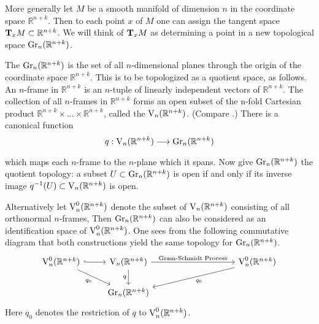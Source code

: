 \documentclass[../main]{subfiles}
\begin{document}
More generally let $M$ be a smooth manifold of dimension $n$ in the coordinate space $\mathbb{R}^{n+k}$. Then to each point $x$ of $M$ one can assign the tangent space \newline $\tangentspace{M}{x} \subset \mathbb{R}^{n+k}$. We will think of $\tangentspace{M}{x}$ as determining a point in a new topological space $\grassmannian_n (\mathbb{R}^{n+k})$.
\begin{definition}\label{def:5-1}
The  $\grassmannian_n (\mathbb{R}^{n+k})$ is the set of all $n$-dimensional planes through the origin of the coordinate space $\mathbb{R}^{n+k}$. This is to be topologized as a quotient space, as follows.
An $n$-frame in $\mathbb{R}^{n+k}$ is an $n$-tuple of linearly independent vectors of $\mathbb{R}^{n+k}$. The collection of all $n$-frames in $\mathbb{R}^{n+k}$ forms an open subset of the n-fold Cartesian product $\mathbb{R}^{n+k} \times \dots \times \mathbb{R}^{n+k}$, called the  $\StiefelManifold_n(\mathbb{R}^{n+k}) $. (Compare \cite[$\S$7.7]{steenrod1951}.) There is a canonical function
\[q:\StiefelManifold_n(\mathbb{R}^{n+k})\varrightarrow{}\grassmannian_n (\mathbb{R}^{n+k}) \]
which maps each $n$-frame to the $n$-plane which it spans. Now give $\grassmannian_n (\mathbb{R}^{n+k})$ the quotient topology: a subset $U \subset \grassmannian_n (\mathbb{R}^{n+k})$ is open if and only if its inverse image $q^{-1}(U) \subset \StiefelManifold_n(\mathbb{R}^{n+k})$ is open.

Alternatively let $\StiefelManifold_n^0(\mathbb{R}^{n+k})$ denote the subset of $\StiefelManifold_n(\mathbb{R}^{n+k})$ consisting of all orthonormal $n$-frames, Then $\grassmannian_n (\mathbb{R}^{n+k})$ can also be considered as an identification space of $\StiefelManifold_n^0(\mathbb{R}^{n+k})$. One sees from the following
commutative diagram that both constructions yield the same topology for $\grassmannian_n (\mathbb{R}^{n+k})$.
\[\begin{tikzcd}
	\StiefelManifold_n^0(\mathbb{R}^{n+k}) \arrow[r, hook] \arrow[rd, "q_0"'] & \StiefelManifold_n(\mathbb{R}^{n+k}) \arrow[d, "q"'] \arrow[rrrr, "\text{Gram-Schmidt Process}"] &  &  & & \StiefelManifold_n^0(\mathbb{R}^{n+k}) \arrow[lllld, "q_0"] \\
	& \grassmannian_n (\mathbb{R}^{n+k})                                                         &  &  &   &                                     
\end{tikzcd}\]
Here $q_0$ denotes the restriction of $q$ to $\StiefelManifold_n^0(\mathbb{R}^{n+k})$.	
\end{definition}
\end{document}
